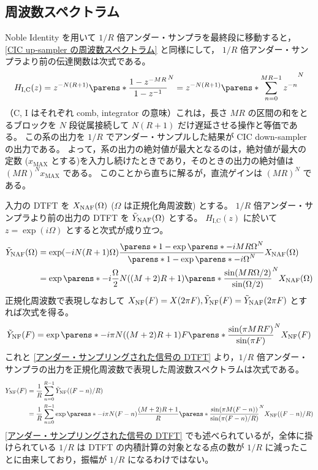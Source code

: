     \subsection{周波数スペクトラム}
        Noble Identity を用いて $1/R$ 倍アンダー・サンプラを最終段に移動すると，\ref{CIC up-sampler の周波数スペクトラム} と同様にして， $1/R$ 倍アンダー・サンプラより前の伝達関数は次式である。
        \[ H_\text{I,C}(z) = z^{-N(R+1)}\parens*{\frac{1-z^{-MR}}{1-z^{-1}}}^N = z^{-N(R+1)}\parens*{\sum_{n=0}^{MR-1}z^{-n}}^N \]
        （C, I はそれぞれ comb, integrator の意味）これは，長さ $MR$ の区間の和をとるブロックを $N$ 段従属接続して $N(R+1)$ だけ遅延させる操作と等価である。
        この系の出力を $1/R$ でアンダー・サンプルした結果が CIC down-sampler の出力である。
        よって，系の出力の絶対値が最大となるのは，絶対値が最大の定数 ($x_\text{MAX}$ とする)を入力し続けたときであり，そのときの出力の絶対値は $(MR)^N x_\text{MAX}$ である。
        このことから直ちに解るが，直流ゲインは $(MR)^N$ である。
        \par
        入力の DTFT を $X_\text{NAF}(\Omega)$ ($\Omega$ は正規化角周波数) とする。
        $1/R$ 倍アンダー・サンプラより前の出力の DTFT を $\tilde{Y}_\text{NAF}(\Omega)$ とする。
        $H_\text{I,C}(z)$ に於いて $z = \exp(i\Omega)$ とすると次式が成り立つ。
        \begin{align*}
            \tYNAF(\Omega) &= \exp(-iN(R+1)\Omega)\frac{\parens*{1-\exp\parens*{-iMR\Omega}}^N}{\parens*{1-\exp\parens*{-i\Omega}}^N}\XNAF(\Omega) \\
            &= \exp\parens*{-i\frac{\Omega}{2}N((M+2)R+1)}\parens*{\frac{\sin(MR\Omega/2)}{\sin(\Omega/2)}}^N \XNAF(\Omega)
        \end{align*}
        正規化周波数で表現しなおして $X_\text{NF}(F) = X(2\pi F), \tilde{Y}_\text{NF}(F) = \tilde{Y}_\text{NAF}(2\pi F)$ とすれば次式を得る。
        \[ \tYNF(F) = \exp\parens*{-i\pi N((M+2)R+1)F}\parens*{\frac{\sin(\pi MRF)}{\sin(\pi F)}}^N \XNF(F) \]
        これと \ref{アンダー・サンプリングされた信号の DTFT} より，$1/R$ 倍アンダー・サンプラの出力を正規化周波数で表現した周波数スペクトラムは次式である。
        \begin{align}
            \YNF(F) &= \frac{1}{R}\sum_{n=0}^{R-1} \tYNF((F-n)/R) \nonumber \\
            &= \frac{1}{R}\sum_{n=0}^{R-1} \exp\parens*{-i\pi N(F-n)\frac{(M+2)R+1}{R}}\parens*{\frac{\sin(\pi M(F-n))}{\sin(\pi(F-n)/R)}}^N \XNF((F-n)/R) \label{equation:CIC down-sampler の周波数スペクトラム}
        \end{align}
        \ref{アンダー・サンプリングされた信号の DTFT} でも述べられているが，全体に掛けられている $1/R$ は DTFT の内積計算の対象となる点の数が $1/R$ に減ったことに由来しており，振幅が $1/R$ になるわけではない。
